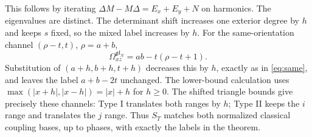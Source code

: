 \documentclass[10pt,a4paper]{article}
\begin{document}
This follows by iterating $\Delta M-M\Delta=E_x+E_y+N$ on harmonics.
The eigenvalues are distinct. The determinant shift increases one exterior
degree by $h$ and keeps $s$ fixed, so the mixed label increases by $h$.
For the same-orientation channel $(\rho-t,t)$, $\rho=a+b$,
\begin{equation}\label{eq:samespec}
 \Omega_{xz}^{\mathfrak{gl}_N}=ab-t(\rho-t+1).
\end{equation}
Substitution of $(a+h,b+h,t+h)$ decreases this by $h$, exactly as in
\eqref{eq:same}, and leaves the label $a+b-2t$ unchanged.
The lower-bound calculation uses
$\max(|x+h|,|x-h|)=|x|+h$ for $h\ge0$.
The shifted triangle bounds give precisely these channels: Type I
translates both ranges by $h$; Type II keeps the $i$ range and translates
the $j$ range. Thus $S_T$ matches both normalized classical coupling
bases, up to phases, with exactly the labels in the theorem.
\end{document}
